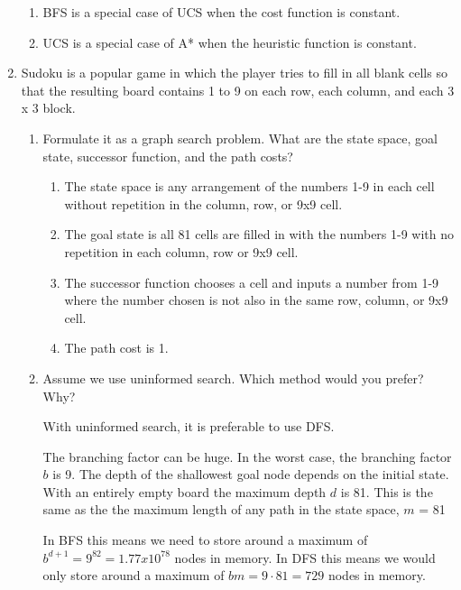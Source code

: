 \documentclass[12pt,letterpaper]{article}
\begin{document}
\begin{enumerate}
      \begin{enumerate}
        \item BFS is a special case of UCS when the cost function is constant.
        \item UCS is a special case of A* when the heuristic function is constant.
      \end{enumerate}

    \pagebreak

    \item
      Sudoku is a popular game in which the player tries to fill in all blank cells
      so that the resulting board contains 1 to 9 on each
      row, each column, and each 3 x 3 block.

      \begin{enumerate}
        \item
          Formulate it as a graph search problem.
          What are the state space, goal state, successor function, and the path costs?
          \begin{enumerate}
            \item
              The state space is any arrangement of the numbers 1-9 in each cell
              without repetition in the column, row, or 9x9 cell.
            \item
              The goal state is all 81 cells are filled in with
              the numbers 1-9 with no repetition in each column, row or 9x9 cell.
            \item
              The successor function chooses a cell and inputs a number from 1-9
              where the number chosen is not also in the same row, column, or 9x9 cell.
            \item
              The path cost is 1.
          \end{enumerate}
        \item
          Assume we use uninformed search.
          Which method would you prefer? Why?

          With uninformed search, it is preferable to use DFS.

          The branching factor can be huge.
          In the worst case, the branching factor $b$ is 9.
          The depth of the shallowest goal node depends on the initial state.
          With an entirely empty board the maximum depth $d$ is 81.
          This is the same as the the maximum length of any path in the state space,
          $m$ = 81

          In BFS this means we need to store around a maximum of $b^{d+1} = 9^82 = 1.77 x 10^78$ nodes in memory.
          In DFS this means we would only store around a maximum of $bm = 9 \cdot 81 = 729$ nodes in memory.


\end{enumerate}
\end{enumerate}
\end{document}
